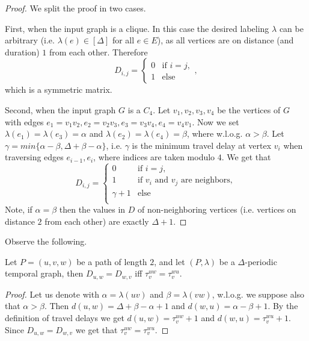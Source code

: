 \documentclass[a4paper,UKenglish,cleveref, autoref, thm-restate]{lipics-v2021}
\begin{document}
\begin{proof}
	We split the proof in two cases.
	
	First, when the input graph is a clique. In this case the desired labeling $\lambda$ can be arbitrary (i.e. $\lambda(e) \in [\Delta]$ for all $e \in E$), 
	as all vertices are on distance (and duration) $1$ from each other.
	Therefore 
	\begin{equation*}
		D_{i,j} =
		\begin{cases}
			0 & \text{if $i = j$}, \\
			1 & \text{else}
		\end{cases},
	\end{equation*}
	which is a symmetric matrix.
	
	Second, when the input graph $G$ is a $C_4$. Let $v_1, v_2, v_3, v_4$ be the vertices of $G$ with edges $e_1 = v_1 v_2, e_2 = v_2 v_3, e_3 = v_3 v_4, e_4 = v_4 v_1$.
	Now we set $\lambda(e_1) = \lambda (e_3) = \alpha$ and $\lambda(e_2) = \lambda(e_4) = \beta$, where w.l.o.g. $\alpha > \beta$.
	Let $\gamma = min \{ \alpha - \beta, \Delta + \beta - \alpha\}$,
	i.e. $\gamma$ is the minimum travel delay at vertex $v_i$ when traversing edges $e_{i-1}, e_i$, where indices are taken modulo $4$.
	We get that 
	\begin{equation*}
		D_{i,j} =
		\begin{cases}
			0 & \text{if $i = j$}, \\
			1 & \text{if $v_i$ and $v_j$ are neighbors},\\
			\gamma + 1 & \text{else}\\
		\end{cases}
	\end{equation*}
	Note, if $\alpha = \beta$ then the values in $D$ of non-neighboring vertices (i.e. vertices on distance $2$ from each other)
	are exactly $\Delta + 1$.
\end{proof}


Observe the following.
\begin{claim}
	Let $P = (u, v, w)$ be a path of length $2$, and let $(P,\lambda)$ be a $\Delta$-periodic temporal graph,
	 then $D_{u,w} = D_{w,v}$ iff $\tau_v^{uw} = \tau_v^{wu}$. 
\end{claim}
\begin{proof}
	Let us denote with $\alpha = \lambda(uv)$ and  $\beta = \lambda(vw)$,
	w.l.o.g. we suppose also that $\alpha > \beta$.
	Then $d(u,w) = \Delta + \beta - \alpha + 1$ 
	and $d(w,u) = \alpha - \beta + 1$.
	By the definition of travel delays we get $d(u,w) = \tau_v^{uw} + 1$ and $d(w,u) = \tau_v^{wu} + 1$. 
	Since $D_{u,w} = D_{w,v}$ we get that $\tau_v^{uw} = \tau_v^{wu}$.
\end{proof}
\end{document}
